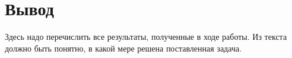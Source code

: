 \section{Вывод}
\label{sec:Chapter5} 

Здесь надо перечислить все результаты, полученные в ходе работы. Из текста
должно быть понятно, в какой мере решена поставленная задача.

\newpage
